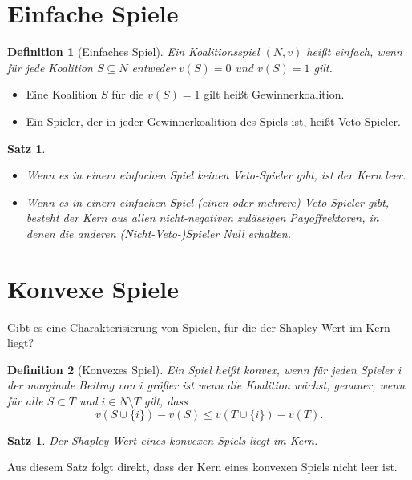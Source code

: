 \documentclass[12pt]{extreport} %
\theoremstyle{named}
\theoremstyle{itshape}
\newtheorem{satz}[unnamedtheorem]{Satz}
\newtheorem*{definition}{Definition}
\theoremstyle{normal}
\begin{document}
\section{Einfache Spiele} 

\begin{definition}[Einfaches Spiel]
	Ein Koalitionsspiel $(N, v)$ hei{\ss}t einfach, wenn für jede Koalition $S \subseteq N$ entweder $v(S) = 0$ und $v(S) = 1$ gilt.
\end{definition}

\begin{itemize}
	\item Eine Koalition $S$ für die $v(S) = 1$ gilt hei{\ss}t Gewinnerkoalition.
	\item Ein Spieler, der in jeder Gewinnerkoalition des Spiels ist, hei{\ss}t Veto-Spieler.
\end{itemize}

\begin{satz} ~\
	\begin{itemize}
		\item Wenn es in einem einfachen Spiel keinen Veto-Spieler gibt, ist der Kern leer.
		\item Wenn es in einem einfachen Spiel (einen oder mehrere) Veto-Spieler gibt, besteht der Kern aus allen nicht-negativen zulässigen Payoffvektoren, in denen die anderen (Nicht-Veto-)Spieler Null erhalten.
	\end{itemize}
\end{satz}

\section{Konvexe Spiele} 

Gibt es eine Charakterisierung von Spielen, für die der Shapley-Wert im Kern liegt?

\begin{definition}[Konvexes Spiel]
	Ein Spiel heißt konvex, wenn für jeden Spieler $i$ der marginale Beitrag von $i$ grö{\ss}er ist wenn die Koalition wächst; genauer, wenn für alle $S \subset T$ und $i \in N \setminus T$ gilt, dass
	$$ v( S \cup \{i\}) - v(S) \leq v( T \cup \{ i \}) - v(T). $$
\end{definition}

\begin{satz}
	Der Shapley-Wert eines konvexen Spiels liegt im Kern.
\end{satz}
Aus diesem Satz folgt direkt, dass der Kern eines konvexen Spiels nicht leer ist.
\end{document}
